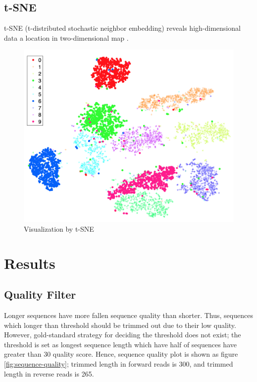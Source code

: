 \documentclass[a4paper]{article}
\begin{document}
        \subsection{t-SNE}
            t-SNE (t-distributed stochastic neighbor embedding) reveals high-dimensional data a location in two-dimensional map \cite{tSNE1}.

            \begin{figure}[p]
                \centering
                \includegraphics[width=0.4 \linewidth]{figures/tSNE.png}
                \caption{Visualization by t-SNE \protect\cite{tSNE1}}
            \end{figure}

    \section{Results}
        \subsection{Quality Filter}
            Longer sequences have more fallen sequence quality than shorter. Thus, sequences which longer than threshold should be trimmed out due to their low quality. However, gold-standard strategy for deciding the threshold does not exist; the threshold is set as longest sequence length which have half of sequences have greater than 30 quality score. Hence, sequence quality plot is shown as figure \ref{fig:sequence-quality}; trimmed length in forward reads is 300, and trimmed length in reverse reads is 265.
\end{document}
